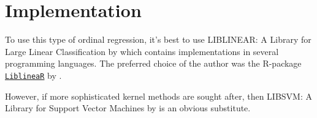 \section{Implementation}
To use this type of ordinal regression, it's best to use LIBLINEAR: A 
Library for Large Linear Classification by \citet{main:LIBLINEAR} which 
contains implementations in several programming languages. The preferred choice 
of the author was the R-package 
\href{https://cran.r-project.org/web/packages/LiblineaR/}{\texttt{LiblineaR}} 
by \citet{cran:LiblineaR}.

However, if more sophisticated kernel methods are sought after, then {LIBSVM}: 
A Library for Support Vector Machines by 
\citet{main:LIBSVM} is an obvious substitute.

